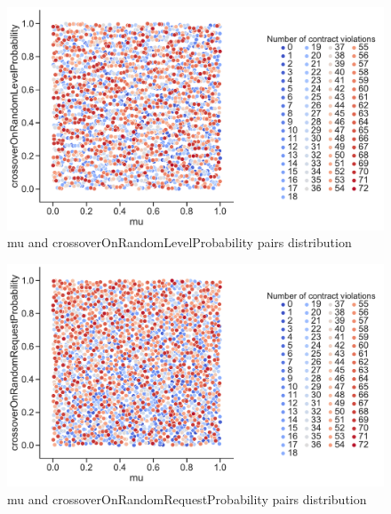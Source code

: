 \begin{figure}
	\centering
	\includegraphics[width=\textwidth]{images/PairsDistr/mu_crossoverOnRandomLevelProbability.pdf}
	\caption[mu and crossoverOnRandomLevelProbability pairs distribution]{mu and crossoverOnRandomLevelProbability pairs distribution}
	\label{fig:mu_crossoverOnRandomLevelProbability_pair}
\end{figure}
\begin{figure}
	\centering
	\includegraphics[width=\textwidth]{images/PairsDistr/mu_crossoverOnRandomRequestProbability.pdf}
	\caption[mu and crossoverOnRandomRequestProbability pairs distribution]{mu and crossoverOnRandomRequestProbability pairs distribution}
	\label{fig:mu_crossoverOnRandomRequestProbability_pair}
\end{figure}
